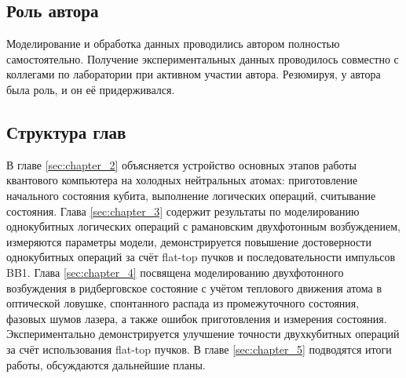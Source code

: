 \subsection{Роль автора}

Моделирование и обработка данных проводились автором полностью самостоятельно. Получение экспериментальных данных проводилось совместно с коллегами по лаборатории при активном участии автора. Резюмируя, у автора была роль, и он её придерживался.

\subsection{Структура глав} 

В главе \ref{sec:chapter_2} объясняется устройство основных этапов работы квантового компьютера на холодных нейтральных атомах: приготовление начального состояния кубита, выполнение логических операций, считывание состояния. Глава \ref{sec:chapter_3} содержит результаты по моделированию однокубитных логических операций с рамановским двухфотонным возбуждением, измеряются параметры модели, демонстрируется повышение достоверности однокубитных операций за счёт flat-top пучков и последовательности импульсов BB1. Глава \ref{sec:chapter_4} посвящена моделированию двухфотонного возбуждения в ридберговское состояние с учётом теплового движения атома в оптической ловушке, спонтанного распада из промежуточного состояния, фазовых шумов лазера, а также ошибок приготовления и измерения состояния. Экспериментально демонстрируется улучшение точности двухкубитных операций за счёт использования flat-top пучков. В главе \ref{sec:chapter_5} подводятся итоги работы, обсуждаются дальнейшие планы.

\newpage
